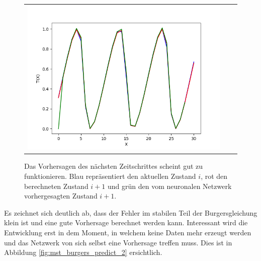 \begin{figure}
\begin{tabular}{ccc}
		\includegraphics[scale=0.27]{learning/img/burger_predict20.png}
	\end{tabular}
	\caption{Das Vorhersagen des nächsten Zeitschrittes scheint
	gut zu funktionieren. Blau repräsentiert den aktuellen
	Zustand $i$, rot den berechneten Zustand $i+1$ und grün den
	vom neuronalen Netzwerk vorhergesagten Zustand $i+1$.
	\label{fig:mst_burgers_predict_1}
	}
\end{figure}

Es zeichnet sich deutlich ab, dass der Fehler im stabilen Teil der
Burgersgleichung klein ist und eine gute Vorhersage berechnet werden
kann. Interessant wird die Entwicklung erst in dem Moment, in welchem
keine Daten mehr erzeugt werden und das Netzwerk von sich selbst
eine Vorhersage treffen muss. Dies ist in Abbildung
\ref{fig:mst_burgers_predict_2} ersichtlich.

